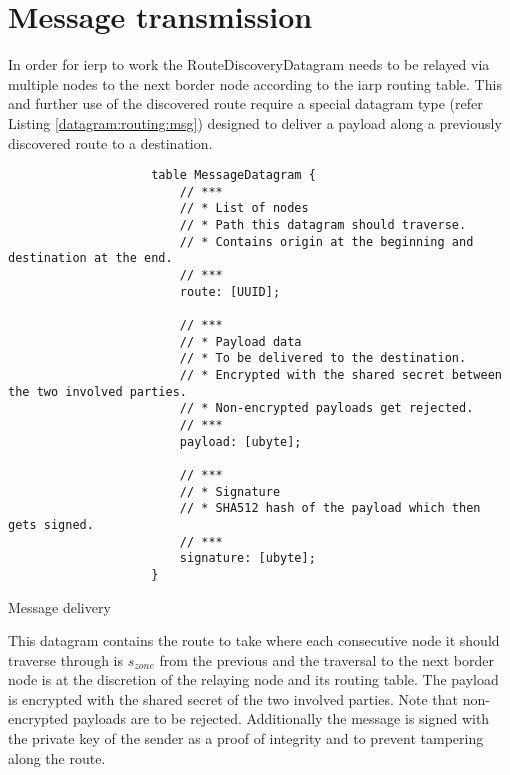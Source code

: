 \documentclass[a4paper]{report}
\begin{document}
        \section{Message transmission}\label{section:datagram:msg}
            In order for \acrshort{ierp} to work the RouteDiscoveryDatagram needs to be relayed via multiple nodes to the next border node according to the \acrshort{iarp} routing table. This and further use of the discovered route require a special \gls{datagram} type (refer Listing \ref{datagram:routing:msg}) designed to deliver a payload along a previously discovered route to a destination.
            \begin{listing}
                \begin{verbatim}
                    table MessageDatagram {
                        // ***
                        // * List of nodes
                        // * Path this datagram should traverse.
                        // * Contains origin at the beginning and destination at the end.
                        // ***
                        route: [UUID];
                    
                        // ***
                        // * Payload data
                        // * To be delivered to the destination.
                        // * Encrypted with the shared secret between the two involved parties.
                        // * Non-encrypted payloads get rejected.
                        // ***
                        payload: [ubyte];
                    
                        // ***
                        // * Signature
                        // * SHA512 hash of the payload which then gets signed.
                        // ***
                        signature: [ubyte];
                    }
                \end{verbatim}
                \caption{Message delivery}
                \label{datagram:routing:msg}
            \end{listing}
            This \gls{datagram} contains the route to take where each consecutive node it should traverse through is $s_{zone}$ from the previous and the traversal to the next border node is at the discretion of the relaying node and its routing table. The payload is encrypted with the shared secret of the two involved parties. Note that non-encrypted payloads are to be rejected. Additionally the message is signed with the private key of the sender as a proof of integrity and to prevent tampering along the route.
            
\end{document}
